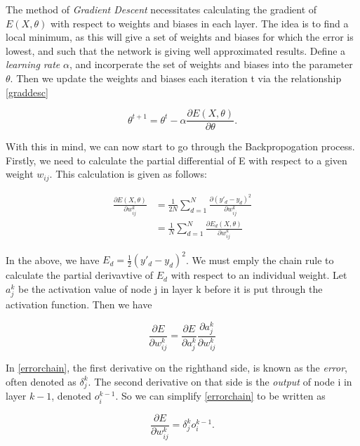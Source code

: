 The method of \textit{Gradient Descent} necessitates calculating the gradient of $E(X,\theta)$ with respect to weights and biases in each layer. The idea is to find a local minimum, as this will
give a set of weights and biases for which the error is lowest, and such that the network is giving well approximated results. Define a \textit{learning rate} $\alpha$, and incorperate the set of weights
and biases into the parameter $\theta$. Then we update the weights and biases each iteration t via the relationship \ref{graddesc}

\begin{equation}
    \label{graddesc}
    \theta^{t+1} = \theta^t - \alpha\frac{\partial E(X,\theta)}{\partial \theta}.
\end{equation}

With this in mind, we can now start to go through the Backpropogation process. Firstly, we need to calculate the partial differential of E with respect to a given weight $w_{ij}$. This calculation is given as follows:

\begin{align}
    \frac{\partial E(X,\theta)}{\partial w_{ij}^k} &= \frac{1}{2N}\sum_{d=1}^N\frac{\partial (y'_d-y_d)^2}{\partial w_{ij}^k} \\
                                                   &= \frac{1}{N}\sum^N_{d=1} \frac{\partial E_d(X,\theta)}{\partial w_{ij}^k}
\end{align}

In the above, we have $E_d = \frac{1}{2}(y'_d-y_d)^2$.  We must emply the chain rule to calculate the partial derivavtive of $E_d$ with respect to an individual weight. 
Let $a_j^k$ be the activation value of node j in layer k before it is put through the activation function. Then we have

\begin{equation}
    \label{errorchain}
    \frac{\partial E}{\partial w_{ij}^k} = \frac{\partial E}{\partial a_j^k}\frac{\partial a_j^k}{\partial w_{ij}^k}
\end{equation}

In \ref{errorchain}, the first derivative on the righthand side, is known as the \textit{error}, often denoted as $\delta_j^k$. The second derivative on that side
is the \textit{output} of node i in layer $k-1$, denoted $o_i^{k-1}$. So we can simplify \ref{errorchain} to be written as

\begin{equation}
    \frac{\partial E}{\partial w_{ij}^k} = \delta^k_jo_i^{k-1}.
\end{equation}


